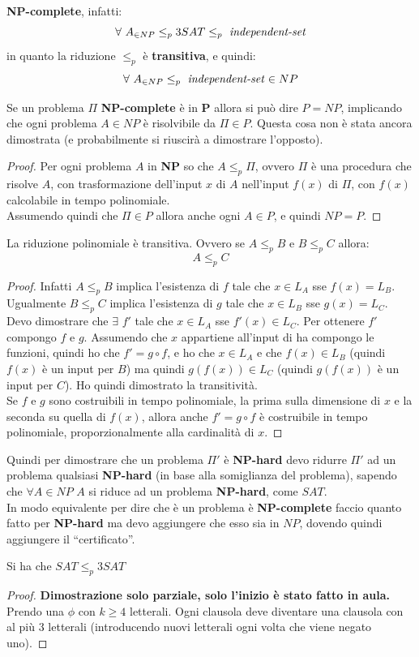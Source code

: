 \documentclass[a4paper,12pt, oneside]{book}
\begin{document}
\textbf{NP-complete}, infatti:
\[\forall\,\, A_{\in NP}\leq_p 3SAT\leq_p \mbox{ \textit{independent-set}}\]
in quanto la riduzione $\leq_p$ è \textbf{transitiva}, e quindi:
\[\forall\,\, A_{\in NP}\leq_p \mbox{ \textit{independent-set}}\in NP\]
\begin{teorema}
  Se un problema $\Pi$ \textbf{NP-complete} è in \textbf{P} allora si può dire
  $P=NP$, implicando che ogni problema $A\in NP$ è risolvibile da $\Pi\in P$.
  Questa cosa non è stata ancora dimostrata (e probabilmente si riuscirà
  a dimostrare l'opposto).
\end{teorema}
\begin{proof}
  Per ogni problema $A$ in \textbf{NP} so che $A\leq_p \Pi$, ovvero $\Pi$ è una
  procedura che risolve $A$, con trasformazione dell'input $x$ di $A$ nell'input
  $f(x)$ di $\Pi$, con $f(x)$ calcolabile in tempo polinomiale.\\
  Assumendo quindi che $\Pi\in P$ allora anche ogni $A\in P$, e quindi $NP=P$.
\end{proof}
\begin{teorema}
  La riduzione polinomiale è transitiva. Ovvero se $A\leq_p B$ e $B\leq_p C$
  allora:
  \[A\leq_p C\]
\end{teorema}
\begin{proof}
  Infatti $A\leq_p B$ implica l'esistenza di $f$ tale che $x\in L_A$ sse
  $f(x)=L_B$. Ugualmente $B\leq_p C$ implica l'esistenza di $g$ tale che $x\in
  L_B$ sse $g(x)=L_C$.\\
  Devo dimostrare che $\exists\,\,f'$ tale che $x\in L_A$ sse $f'(x)\in
  L_C$. Per ottenere $f'$ compongo $f$ e $g$. Assumendo che $x$ appartiene
  all'input di ha compongo le funzioni, quindi ho che $f'=g\circ f$,
  e ho che $x\in L_A$ e che $f(x)\in L_B$ (quindi $f(x)$ è un input per $B$) ma
  quindi $g(f(x))\in L_C$ (quindi $g(f(x))$ è un input per $C$). Ho quindi
  dimostrato la transitività.\\
  Se $f$ e $g$ sono costruibili in tempo polinomiale, la prima sulla dimensione
  di $x$ e la seconda su quella di $f(x)$, allora anche $f'=g\circ f$
  è costruibile in tempo polinomiale, proporzionalmente alla cardinalità di $x$.
\end{proof}
Quindi per dimostrare che un problema $\Pi'$ è \textbf{NP-hard} devo ridurre
$\Pi'$ ad un problema qualsiasi \textbf{NP-hard} (in base alla somiglianza del
problema), sapendo che $\forall A\in NP$ $A$ si riduce ad un problema
\textbf{NP-hard}, come $SAT$.\\
In modo equivalente per dire che è un problema è \textbf{NP-complete} faccio
quanto fatto per \textbf{NP-hard} ma devo aggiungere che esso sia in $NP$,
dovendo quindi aggiungere il ``certificato''.
\begin{teorema}
  Si ha che $SAT\leq_p 3SAT$
\end{teorema}
\begin{proof}
  \textbf{Dimostrazione solo parziale, solo l'inizio è stato fatto in aula.\\}
  Prendo una $\phi$ con $k\geq 4$ letterali. Ogni clausola deve diventare una
  clausola con al più 3 letterali (introducendo nuovi letterali ogni volta che
  viene negato uno). 
\end{proof}
\end{document}
